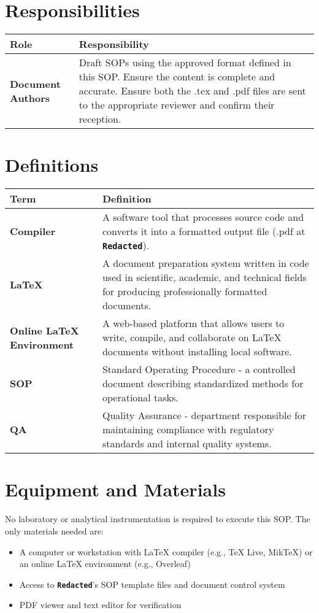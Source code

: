 \documentclass[11pt]{article}
\newcommand{\CompanyName}{\textbf{\texttt{Redacted}}}
\begin{document}
\section{Responsibilities}
    \begin{center}
        \begin{tabularx}{\textwidth}{|l|X|}
        \hline
        \rowcolor{gray!30}
        \textbf{Role} & \textbf{Responsibility} \\
        \hline
        \textbf{Document Authors} & Draft SOPs using the approved format defined in this SOP. Ensure the content is complete and accurate. Ensure both the .tex and .pdf files are sent to the appropriate reviewer and confirm their reception.\\
        \hline
        \end{tabularx}
    \end{center}

\section{Definitions}
\begin{tabularx}{\textwidth}{|l|X|}
\hline
\rowcolor{gray!30}
\textbf{Term} & \textbf{Definition} \\
\hline
\textbf{Compiler} & A software tool that processes source code and converts it into a formatted output file (.pdf at \CompanyName).\\
\hline
\textbf{LaTeX} & A document preparation system written in code used in scientific, academic, and technical fields for producing professionally formatted documents.\\
\hline
\textbf{Online LaTeX Environment} & A web-based platform that allows users to write, compile, and collaborate on LaTeX documents without installing local software.\\
\hline
\textbf{SOP} & Standard Operating Procedure - a controlled document describing standardized methods for operational tasks.\\
\hline
\textbf{QA} & Quality Assurance - department responsible for maintaining compliance with regulatory standards and internal quality systems.\\
\hline
\end{tabularx}

\section{Equipment and Materials}
No laboratory or analytical instrumentation is required to execute this SOP. The only materials needed are:
\begin{itemize}
    \item A computer or workstation with LaTeX compiler (e.g., TeX Live, MikTeX) or an online LaTeX environment (e.g., Overleaf)
    \item Access to \CompanyName's SOP template files and document control system
    \item PDF viewer and text editor for verification
\end{itemize}
\end{document}
